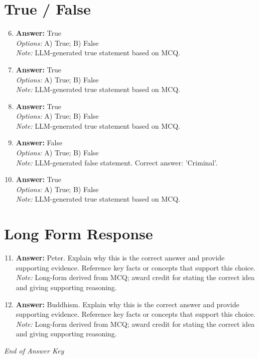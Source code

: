 \documentclass[12pt]{article}
\begin{document}
\section*{True / False}
\begin{enumerate}[label=\arabic*.]
\setcounter{enumi}{5}
\item \textbf{Answer:} True
\\ \textit{Options:} A) True; B) False
\\ \textit{Note:} LLM-generated true statement based on MCQ.
\item \textbf{Answer:} True
\\ \textit{Options:} A) True; B) False
\\ \textit{Note:} LLM-generated true statement based on MCQ.
\item \textbf{Answer:} True
\\ \textit{Options:} A) True; B) False
\\ \textit{Note:} LLM-generated true statement based on MCQ.
\item \textbf{Answer:} False
\\ \textit{Options:} A) True; B) False
\\ \textit{Note:} LLM-generated false statement. Correct answer: 'Criminal'.
\item \textbf{Answer:} True
\\ \textit{Options:} A) True; B) False
\\ \textit{Note:} LLM-generated true statement based on MCQ.
\end{enumerate}

\section*{Long Form Response}
\begin{enumerate}[label=\arabic*.]
\setcounter{enumi}{10}
\item \textbf{Answer:} Peter. Explain why this is the correct answer and provide supporting evidence. Reference key facts or concepts that support this choice.
\\ \textit{Note:} Long-form derived from MCQ; award credit for stating the correct idea and giving supporting reasoning.
\item \textbf{Answer:} Buddhism. Explain why this is the correct answer and provide supporting evidence. Reference key facts or concepts that support this choice.
\\ \textit{Note:} Long-form derived from MCQ; award credit for stating the correct idea and giving supporting reasoning.
\end{enumerate}

\vfill
\noindent\textit{End of Answer Key}
\end{document}
